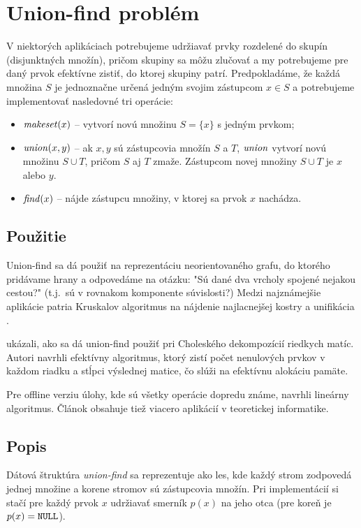 \chapter{Union-find problém}\label{chap:uf}

V niektorých aplikáciach potrebujeme udržiavať prvky rozdelené do skupín
(disjunktných množín), pričom skupiny sa môžu zlučovať a my potrebujeme
pre daný prvok efektívne zistiť, do ktorej skupiny patrí. Predpokladáme,
že každá množina $S$ je jednoznačne určená jedným svojim zástupcom $x\in S$
a potrebujeme implementovať nasledovné tri operácie:

\begin{itemize}
\item $\mathop{\mathit{makeset}}(x)$ -- vytvorí novú množinu $S=\{x\}$ s jedným prvkom; %
\item $\mathop{\mathit{union}}(x, y)$ -- ak $x, y$ sú zástupcovia množín $S$ a $T$,
                 $\mathop{\mathit{union}}$ vytvorí novú množinu $S\cup T$,
                 pričom $S$ aj $T$ zmaže. Zástupcom novej množiny $S\cup T$
                 je $x$ alebo $y$.
\item $\mathop{\mathit{find}}(x)$ -- nájde zástupcu množiny, v ktorej sa 
                prvok $x$ nachádza.
\end{itemize}
 
\section{Použitie}\label{sec:uf-pouzitie}

Union-find sa dá použiť na reprezentáciu neorientovaného grafu,
do ktorého pridávame hrany a odpovedáme na otázku: "Sú dané dva
vrcholy spojené nejakou cestou?" (t.j.\ sú v rovnakom komponente súvislosti?)
Medzi najznámejšie aplikácie patria Kruskalov algoritmus na nájdenie najlacnejšej
kostry \citep{kruskal} a unifikácia \citep{unif}.

\citet{cholesky} ukázali, ako sa dá union-find použiť pri Choleského dekompozícií
riedkych matíc. Autori navrhli efektívny algoritmus, ktorý zistí počet nenulových
prvkov v každom riadku a stĺpci výslednej matice, čo slúži na efektívnu alokáciu
pamäte.

Pre offline verziu úlohy, kde sú všetky operácie dopredu známe, \citet{offline-uf}
navrhli lineárny algoritmus. Článok obsahuje tiež viacero aplikácií v teoretickej
informatike.

\section{Popis}
Dátová štruktúra \emph{union-find} sa reprezentuje ako les, kde každý strom zodpovedá
jednej množine a korene stromov sú zástupcovia množín. Pri implementácií si
stačí pre každý prvok $x$ udržiavať smerník $p(x)$ na jeho otca
(pre koreň je $p(x)=\texttt{NULL}$).

